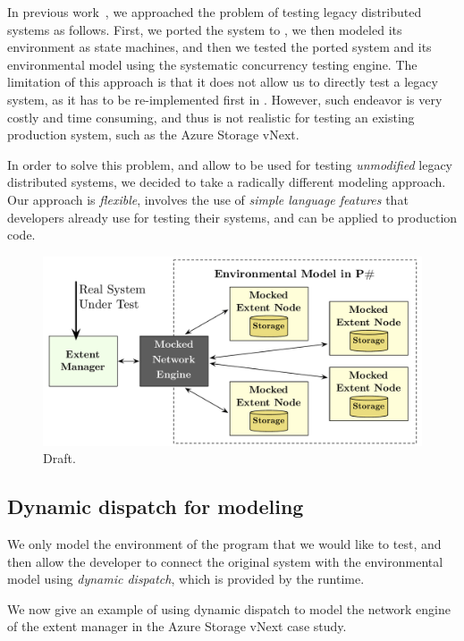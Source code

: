In previous work~\cite{deligiannis2015psharp}, we approached the problem of testing legacy distributed systems as follows. First, we ported the system to \psharp, we then modeled its environment as \psharp state machines, and then we tested the ported system and its environmental model using the \psharp systematic concurrency testing engine. The limitation of this approach is that it does not allow us to directly test a legacy system, as it has to be re-implemented first in \psharp. However, such endeavor is very costly and time consuming, and thus is not realistic for testing an existing production system, such as the Azure Storage vNext.

In order to solve this problem, and allow \psharp to be used for testing \emph{unmodified} legacy distributed systems, we decided to take a radically different modeling approach. Our approach is \emph{flexible}, involves the use of \emph{simple language features} that developers already use for testing their systems, and can be applied to production code.

\begin{figure}[t]
\centering
\includegraphics[width=\linewidth]{img/azurestore_model}
\caption{Draft.}
\label{fig:azurestoremodel}
\end{figure}

\subsection{Dynamic dispatch for modeling}
\label{sec:method:dd}

We only model the environment of the program that we would like to test, and then allow the developer to connect the original system with the environmental model using \emph{dynamic dispatch}, which is provided by the \csharp runtime.

We now give an example of using dynamic dispatch to model the network engine of the extent manager in the Azure Storage vNext case study.

